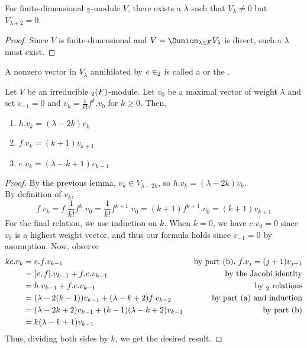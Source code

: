 \documentclass[11pt,leqno,oneside]{amsart}
\numberwithin{thm}{section}
\begin{document}
\begin{prop}
  For finite-dimensional \(\sl_2\)-module \(V\), there exists a
  \(\lambda\) such that \(V_\lambda \neq 0\) but \(V_{\lambda+2} =
  0\). 
\end{prop}
\begin{proof}
  Since \(V\) is finite-dimensional and \(V = \Dunion_{\lambda \in F}
  V_\lambda\) is direct, such a \(\lambda\) must exist.
\end{proof}
\begin{defn}
  A nonzero vector in \(V_\lambda\) annihilated by \(e \in \sl_2\) is
  called a 
   or the .
\end{defn}
\begin{lem}
  Let \(V\) be an irreducible \(\sl_2(F)\)-module. Let \(v_0\) be a
  maximal vector of weight \(\lambda\) and set \(v_{-1} = 0\) and
  \(v_k = \frac{1}{k!} f^k.v_0\) for \(k \geq
  0\). Then,
  \begin{enumerate}
  \item \(h.v_k = (\lambda - 2k)v_k\)
  \item \(f.v_k = (k+1)v_{k+1}\)
  \item \(e.v_k = (\lambda-k+1)v_{k-1}\)
  \end{enumerate}
\end{lem}
\begin{proof}
  By the previous lemma, \(v_k \in V_{\lambda-2k}\), so \(h.v_k =
  (\lambda-2k)v_k\). \\

  By definition of \(v_k\), \[
    f.v_k = f.\frac{1}{k!} f^k.v_0  = \frac{1}{k!} f^{k+1}.v_0 =
    (k+1)f^{k+1}.v_0 = (k+1)v_{k+1}
  \]
  For the final relation, we use induction on \(k\). When \(k=0\), we
  have \(e.v_0 = 0\) since \(v_0\) is a highest weight vector, and
  thus our formula holds since \(v_{-1} = 0\) by assumption. Now,
  observe
  \begin{align*}
    ke.v_k & = e.f.v_{k-1} & \text{ by part (b), }f.v_j = (j+1)v_{j+1}\\
           & = [e,f].v_{k-1} + f.e.v_{k-1} & \text{ by the Jacobi identity}\\
    & = h.v_{k-1} + f.e.v_{k-1} & \text{ by }\sl_2 \text{ relations}
    \\
           & = (\lambda-2(k-1))v_{k-1} + (\lambda - k +2)f.v_{k-2}
                           & \text{ by part (a) and induction} \\
           & = (\lambda-2k+2)v_{k-1} + (k-1)(\lambda-k+2)v_{k-1}
                           & \text{ by part (b)} \\
           & = k(\lambda-k+1) v_{k-1}
  \end{align*}
  Thus, dividing both sides by \(k\), we get the desired result.
\end{proof}
\end{document}
